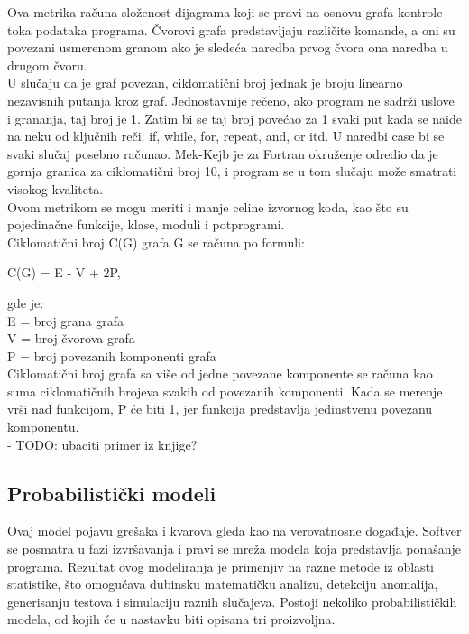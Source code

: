 \documentclass[a4paper]{article}
\begin{document}
Ova metrika računa složenost dijagrama koji se pravi na osnovu grafa kontrole toka podataka programa. Čvorovi grafa predstavljaju različite komande, a oni su povezani usmerenom granom ako je sledeća naredba prvog čvora ona naredba u drugom čvoru. \\
U slučaju da je graf povezan, ciklomatični broj jednak je broju linearno nezavisnih putanja kroz graf. Jednostavnije rečeno, ako program ne sadrži uslove i grananja, taj broj je 1. Zatim bi se taj broj povećao za 1 svaki put kada se naiđe na neku od ključnih reči: if, while, for, repeat, and, or itd. U naredbi case bi se svaki slučaj posebno računao. Mek-Kejb je za Fortran okruženje odredio da je gornja granica za ciklomatični broj 10, i program se u tom slučaju može smatrati visokog kvaliteta.\\
Ovom metrikom se mogu meriti i manje celine izvornog koda, kao što su pojedinačne funkcije, klase, moduli i potprogrami.\\
Ciklomatični broj C(G) grafa G se računa po formuli:
\begin{center}
C(G) = E - V + 2P,
\end{center}
gde je:\\
E = broj grana grafa\\
V = broj čvorova grafa\\
P = broj povezanih komponenti grafa\\

Ciklomatični broj grafa sa više od jedne povezane komponente se računa kao suma ciklomatičnih brojeva svakih od povezanih komponenti. Kada se merenje vrši nad funkcijom,  P će biti 1, jer funkcija predstavlja jedinstvenu povezanu komponentu.\\
- TODO:  ubaciti primer iz knjige? 

\subsection{Probabilistički modeli}
\label{sec:probabilisticki}

Ovaj model pojavu grešaka i kvarova gleda kao na verovatnosne događaje. Softver se posmatra u fazi izvršavanja i pravi se mreža modela koja predstavlja ponašanje programa. Rezultat ovog modeliranja je primenjiv na razne metode iz oblasti statistike, što omogućava dubinsku matematičku analizu, detekciju anomalija, generisanju testova i simulaciju raznih slučajeva. Postoji nekoliko probabilističkih modela, od kojih će u nastavku biti opisana tri proizvoljna. \\
\end{document}
